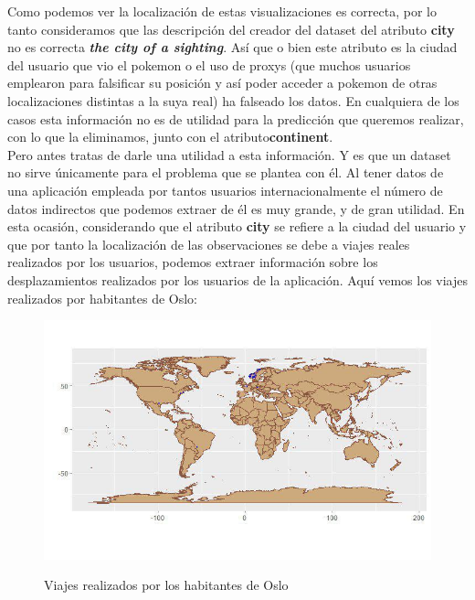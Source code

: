 Como podemos ver la localización de estas visualizaciones es correcta, por lo tanto consideramos que las descripción del creador del dataset del atributo \textbf{city} no es correcta  \textbf\textit{the city of a sighting}. Así que o bien este atributo es la ciudad del usuario que vio el pokemon o el uso de proxys (que muchos usuarios emplearon para falsificar su posición y así poder acceder a pokemon de otras localizaciones distintas a la suya real) ha falseado los datos. En cualquiera de los casos esta información no es de utilidad para la predicción que queremos realizar, con lo que la eliminamos, junto con el atributo\textbf{continent}.\\

Pero antes tratas de darle una utilidad a esta información. Y es que un dataset no sirve únicamente para el problema que se plantea con él. Al tener datos de una aplicación empleada por tantos usuarios internacionalmente el número de datos indirectos que podemos extraer de él es muy grande, y de gran utilidad. En esta ocasión, considerando que el atributo \textbf{city} se refiere a la ciudad del usuario y que por tanto la localización de las observaciones se debe a viajes reales realizados por los usuarios, podemos extraer información sobre los desplazamientos realizados por los usuarios de la aplicación. Aquí vemos los viajes realizados por habitantes de Oslo:

\begin{figure}[H] %
\centering
\includegraphics[scale=0.8]{img/oslo.jpg}  %
\label{img/oslo.jpg}
\caption{Viajes realizados por los habitantes de Oslo}
\end{figure} 

